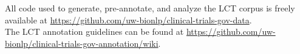 \documentclass[../main.tex]{subfiles}
\begin{document}
All code used to generate, pre-annotate, and analyze the LCT corpus is freely available at \url{https://github.com/uw-bionlp/clinical-trials-gov-data}. \\

\noindent The LCT annotation guidelines can be found at \url{https://github.com/uw-bionlp/clinical-trials-gov-annotation/wiki}.
\end{document}
